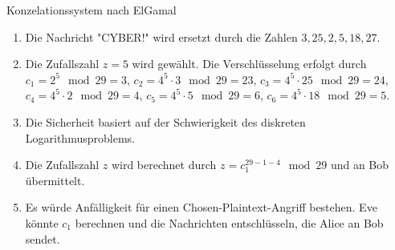 \documentclass{article}
\begin{document}
\begin{exercise}{Konzelationssystem nach ElGamal}
  \begin{solution}
    \begin{enumerate}
        \item Die Nachricht "CYBER!" wird ersetzt durch die Zahlen $3, 25, 2, 5, 18, 27$.
        \item Die Zufallszahl $z=5$ wird gewählt. Die Verschlüsselung erfolgt durch $c_1=2^5 \mod{29}=3$, $c_2=4^5 \cdot 3 \mod{29}=23$, $c_3=4^5 \cdot 25 \mod{29}=24$, $c_4=4^5 \cdot 2 \mod{29}=4$, $c_5=4^5 \cdot 5 \mod{29}=6$, $c_6=4^5 \cdot 18 \mod{29}=5$.
        \item Die Sicherheit basiert auf der Schwierigkeit des diskreten Logarithmusproblems.
        \item Die Zufallszahl $z$ wird berechnet durch $z=c_1^{29-1-4} \mod{29}$ und an Bob übermittelt.
        \item Es würde Anfälligkeit für einen Chosen-Plaintext-Angriff bestehen. Eve könnte $c_1$ berechnen und die Nachrichten entschlüsseln, die Alice an Bob sendet.
    \end{enumerate}
  \end{solution}
\end{exercise}
\end{document}
